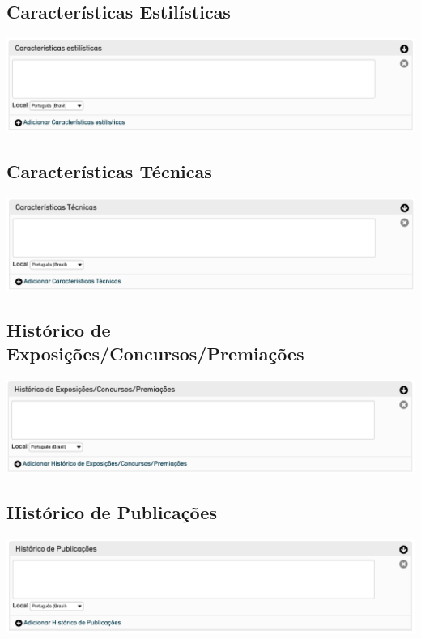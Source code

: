 \subsection{Características Estilísticas}
\begin{flushleft}
	\includegraphics[width=\linewidth]{elemento-20}
\end{flushleft}

\subsection{Características Técnicas}
\begin{flushleft}
	\includegraphics[width=\linewidth]{elemento-21}
\end{flushleft}

\subsection{Histórico de Exposições/Concursos/Premiações}
\begin{flushleft}
	\includegraphics[width=\linewidth]{elemento-22}
\end{flushleft}

\subsection{Histórico de Publicações}
\begin{flushleft}
	\includegraphics[width=\linewidth]{elemento-23}
\end{flushleft}

